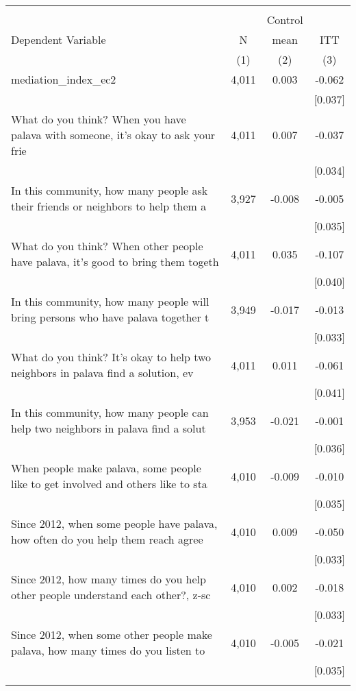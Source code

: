\begin{tabular}{lccc}
\hline \noalign{\smallskip} &  &  & \\
 &  & Control & \\
Dependent Variable & N & mean & ITT\\
 & (1) & (2) & (3)\\
\noalign{\smallskip}\hline \noalign{\smallskip}mediation_index_ec2 & 4,011 & 0.003 & -0.062\\
 &  &  & [0.037]\\
What do you think? When you have palava with someone, it's okay to ask your frie & 4,011 & 0.007 & -0.037\\
 &  &  & [0.034]\\
In this community, how many people ask their friends or neighbors to help them a & 3,927 & -0.008 & -0.005\\
 &  &  & [0.035]\\
What do you think? When other people have palava, it's good to bring them togeth & 4,011 & 0.035 & -0.107\\
 &  &  & [0.040]\\
In this community, how many people will bring persons who have palava together t & 3,949 & -0.017 & -0.013\\
 &  &  & [0.033]\\
What do you think? It's okay to help two neighbors in palava find a solution, ev & 4,011 & 0.011 & -0.061\\
 &  &  & [0.041]\\
In this community, how many people can help two neighbors in palava find a solut & 3,953 & -0.021 & -0.001\\
 &  &  & [0.036]\\
When people make palava, some people like to get involved and others like to sta & 4,010 & -0.009 & -0.010\\
 &  &  & [0.035]\\
Since 2012, when some people have palava, how often do you help them reach agree & 4,010 & 0.009 & -0.050\\
 &  &  & [0.033]\\
Since 2012, how many times do you help other people understand each other?, z-sc & 4,010 & 0.002 & -0.018\\
 &  &  & [0.033]\\
Since 2012, when some other people make palava, how many times do you listen to  & 4,010 & -0.005 & -0.021\\
 &  &  & [0.035]\\
\noalign{\smallskip}\hline\end{tabular}
